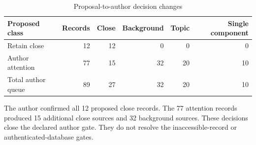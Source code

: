 \begin{table}[t]
\centering
\begin{threeparttable}
\caption{Proposal-to-author decision changes}
\label{tab:author-screening-changes}
\begin{tabular}{l r r r r r}
\toprule
Proposed class & Records & Close & Background & Topic & Single component \\
\midrule
Retain close & 12 & 12 & 0 & 0 & 0 \\
Author attention & 77 & 15 & 32 & 20 & 10 \\
\midrule
Total author queue & 89 & 27 & 32 & 20 & 10 \\
\bottomrule
\end{tabular}
\begin{tablenotes}[flushleft]\footnotesize
\item The author confirmed all 12 proposed close records. The 77 attention records produced 15 additional close sources and 32 background sources. These decisions close the declared author gate. They do not resolve the inaccessible-record or authenticated-database gates.
\end{tablenotes}
\end{threeparttable}
\end{table}


